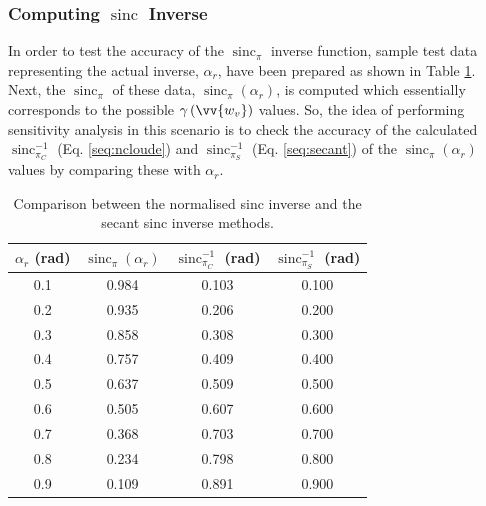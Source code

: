 \documentclass[12pt]{elsarticle}
\numberwithin{equation}{section}
\numberwithin{figure}{section}
\numberwithin{table}{section}
\DeclareMathOperator{\sinc}{sinc}
\begin{document}
\subsubsection[Computing SINC Inverse]{Computing $\sinc$ Inverse}
\label{sssec:sinc}
In order to test the accuracy of the $\sinc_\pi$ inverse function, sample test data representing the actual inverse, $\alpha_r$, have been prepared as shown in Table \ref{table:2}. Next, the $\sinc_\pi$ of these data, $\sinc_{\pi}\left(\alpha_r\right)$, is computed which essentially corresponds to the possible $\gamma\left(\vv{w_v}\right)$ values. So, the idea of performing sensitivity analysis in this scenario is to check the accuracy of the calculated $\sinc_{\pi_C}^{-1}$ (Eq. \eqref{seq:ncloude}) and $\sinc_{\pi_S}^{-1}$ (Eq. \eqref{seq:secant}) of the $\sinc_{\pi}\left(\alpha_r\right)$ values by comparing these with $\alpha_r$.

\begin{table}[ht]
\centering
\caption{\doublespacing Comparison between the normalised \cite{Cloude2010} sinc inverse and the secant sinc inverse methods.}
\label{table:2}
\begin{tabular}{c c c c}
\hline
\boldmath$\alpha_r$ \textbf{(rad)} & \boldmath$\sinc_{\pi}\left(\alpha_r\right)$   & \boldmath$\sinc_{\pi_C}^{-1}$ \textbf{(rad)}     & \boldmath$\sinc_{\pi_S}^{-1}$ \textbf{(rad)} \\ \hline
0.1                 & 0.984            & 0.103          & 0.100  \\ 
0.2                 & 0.935            & 0.206          & 0.200  \\ 
0.3                 & 0.858            & 0.308          & 0.300  \\ 
0.4                 & 0.757            & 0.409          & 0.400  \\ 
0.5                 & 0.637            & 0.509          & 0.500   \\ 
0.6                 & 0.505            & 0.607          & 0.600  \\ 
0.7                 & 0.368            & 0.703          & 0.700   \\ 
0.8                 & 0.234            & 0.798          & 0.800 \\ 
0.9                 & 0.109            & 0.891          & 0.900 \\ \hline

\end{tabular}
\end{table}
\end{document}
